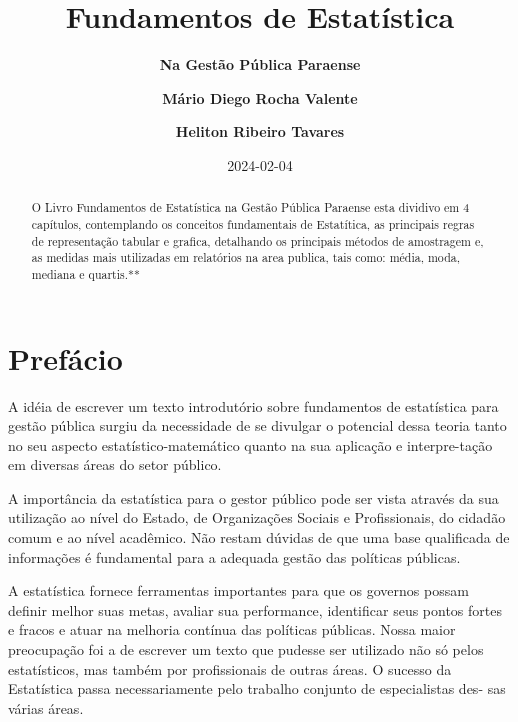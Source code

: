 \documentclass[
  letterpaper,
  DIV=11,
  numbers=noendperiod]{scrreprt}
\title{Fundamentos de Estatística}
\subtitle{\textbf{Na Gestão Pública Paraense}}
\author{\textbf{Mário Diego Rocha Valente} \and \textbf{Heliton Ribeiro
Tavares}}
\date{2024-02-04}
\renewcommand*\contentsname{Table of contents}
\newcommand\contentsname{Table of contents}
\begin{document}
\maketitle
\begin{abstract}
O Livro Fundamentos de Estatística na Gestão Pública Paraense esta
dividivo em 4 capítulos, contemplando os conceitos fundamentais de
Estatítica, as principais regras de representação tabular e grafica,
detalhando os principais métodos de amostragem e, as medidas mais
utilizadas em relatórios na area publica, tais como: média, moda,
mediana e quartis.**
\end{abstract}
\ifdefined\Shaded\renewenvironment{Shaded}{\begin{tcolorbox}[boxrule=0pt, breakable, enhanced, frame hidden, borderline west={3pt}{0pt}{shadecolor}, interior hidden, sharp corners]}{\end{tcolorbox}}\fi

\renewcommand*\contentsname{Table of contents}
{
\hypersetup{linkcolor=}
\setcounter{tocdepth}{2}
\tableofcontents
}

\hypertarget{prefuxe1cio}{%
\chapter*{Prefácio}\label{prefuxe1cio}}


A idéia de escrever um texto introdutório sobre fundamentos de
estatística para gestão pública surgiu da necessidade de se divulgar o
potencial dessa teoria tanto no seu aspecto estatístico-matemático
quanto na sua aplicação e interpre-tação em diversas áreas do setor
público.

A importância da estatística para o gestor público pode ser vista
através da sua utilização ao nível do Estado, de Organizações Sociais e
Profissionais, do cidadão comum e ao nível acadêmico. Não restam dúvidas
de que uma base qualificada de informações é fundamental para a adequada
gestão das políticas públicas.

A estatística fornece ferramentas importantes para que os governos
possam definir melhor suas metas, avaliar sua performance, identificar
seus pontos fortes e fracos e atuar na melhoria contínua das políticas
públicas. Nossa maior preocupação foi a de escrever um texto que pudesse
ser utilizado não só pelos estatísticos, mas também por profissionais de
outras áreas. O sucesso da Estatística passa necessariamente pelo
trabalho conjunto de especialistas des- sas várias áreas.
\end{document}
